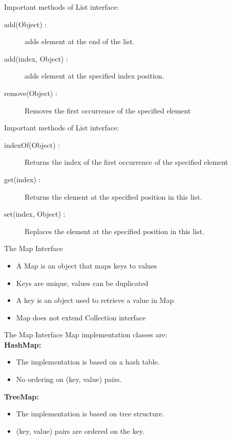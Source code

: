 \documentclass[14pt]{beamer}
\begin{document}
\begin{frame}{Important methods of List interface:}
\begin{description}
\item [add(Object) :] adds element at the end of the list.
\item [add(index, Object) :] adds element at the specified index position.
\item [remove(Object) :] Removes the first occurrence of the specified element
\end{description}
\end{frame}
\begin{frame}{Important methods of List interface:}
\begin{description}
\item [indexOf(Object) :] Returns the index of the first occurrence of the specified element 
\item [get(index) :] Returns the element at the specified position in this list.
\item [set(index, Object) :] Replaces the element at the specified position in this list.
\end{description}
\end{frame}
\begin{frame}{The Map Interface}
\begin{itemize}
\item A Map is an object that maps keys to values
\item Keys are unique, values can be duplicated
\item A key is an object used to retrieve a value in Map
\item Map does not extend Collection interface
\end{itemize}
\end{frame}
\begin{frame}{The Map Interface}
Map implementation classes are: \\
\textbf{HashMap:}

\begin{itemize}
\item The implementation is based on a hash table.
\item No ordering on (key, value) pairs.
\end{itemize}
\textbf{TreeMap:}

\begin{itemize}
\item The implementation is based on tree structure.
\item (key, value) pairs are ordered on the key.
\end{itemize}
\end{frame}
\end{document}
